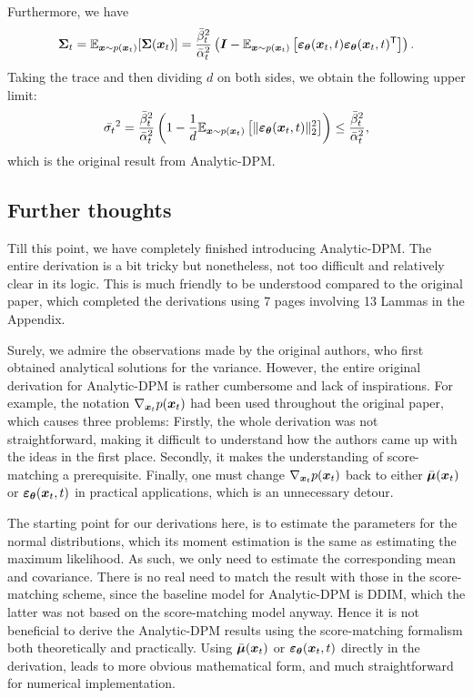 Furthermore, we have 
\begin{equation}
    \label{eq:7.15}
    \bm{\Sigma}_t=\mathbb{E}_{\bm{x}\sim p(\bm{x}_{t})}[\bm{\Sigma}(\bm{x}_{t})]=\frac{\bar{\beta}_t^2}{\bar{\alpha}_t^2}\left(\bm{I}-\mathbb{E}_{\bm{x}\sim p(\bm{x}_{t})}\left[\bm{\varepsilon}_{\bm{\theta}}(\bm{x}_{t},t)\bm{\varepsilon}_{\bm{\theta}}(\bm{x}_{t},t)^{\mathsf{T}} \right]\right).
\end{equation}
Taking the trace and then dividing $d$ on both sides, we obtain the following upper limit:
\begin{equation}
    \label{eq:7.16}
    \bar{\sigma_t}^2=\frac{\bar{\beta}_t^2}{\bar{\alpha}_t^2}\left(1-\frac{1}{d}\mathbb{E}_{\bm{x}\sim p(\bm{x}_{t})} \left[ \| \bm{\varepsilon}_{\bm{\theta}}(\bm{x}_{t},t)\|_2^2\right] \right)\leq\frac{\bar{\beta}_t^2}{\bar{\alpha}_t^2},
\end{equation}
which is the original result from Analytic-DPM.

\subsection{Further thoughts}
Till this point, we have completely finished introducing Analytic-DPM. The entire derivation is a bit tricky but nonetheless, not too difficult and relatively clear in its logic. This is much friendly to be understood compared to the original paper, which completed the derivations using 7 pages involving 13 Lammas in the Appendix. 

Surely, we admire the observations made by the original authors, who first obtained analytical solutions for the variance. However, the entire original derivation for Analytic-DPM is rather cumbersome and lack of inspirations. For example, the notation $\nabla_{\bm{x}_{t}}p(\bm{x}_{t})$ had been used throughout the original paper, which causes three problems: Firstly, the whole derivation was not straightforward,  making it difficult to understand how the authors came up with the ideas in the first place. Secondly, it makes the understanding of score-matching a prerequisite. Finally, one must change  $\nabla_{\bm{x}_{t}}p(\bm{x}_{t})$ back to either $\bar{\bm{\mu}}(\bm{x}_{t})$ or  $\bm{\varepsilon}_{\bm{\theta}}(\bm{x}_{t},t)$ in practical applications, which is an unnecessary detour. 

The starting point for our derivations here, is to estimate the parameters for the normal distributions, which its moment estimation is the same as estimating the maximum likelihood. As such, we only need to estimate the corresponding mean and covariance. There is no real need to match the result with those in the score-matching scheme, since the baseline model for Analytic-DPM is DDIM, which the latter was not based on the score-matching model anyway. Hence it is not beneficial to derive the Analytic-DPM results using the score-matching formalism both theoretically and practically. Using $\bar{\bm{\mu}}(\bm{x}_{t})$ or  $\bm{\varepsilon}_{\bm{\theta}}(\bm{x}_{t},t)$ directly in the derivation, leads to more obvious mathematical form, and much straightforward for numerical implementation.